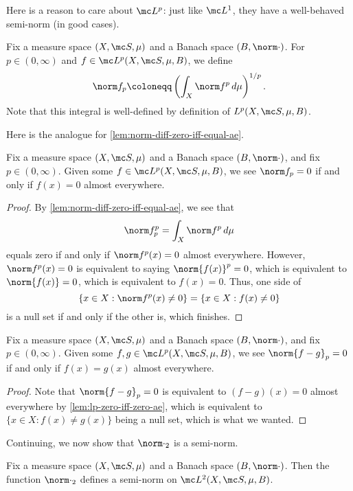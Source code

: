 \documentclass[../notes.tex]{subfiles}
\begin{document}
Here is a reason to care about $\mc L^p$: just like $\mc L^1$, they have a well-behaved semi-norm (in good cases).
\begin{notation}
	Fix a measure space $(X,\mc S,\mu)$ and a Banach space $(B,\norm\cdot)$. For $p\in(0,\infty)$ and $f\in\mc L^p(X,\mc S,\mu,B)$, we define
	\[\norm f_p\coloneqq\left(\int_X\norm f^p\,d\mu\right)^{1/p}.\]
	Note that this integral is well-defined by definition of $L^p(X,\mc S,\mu,B)$.
\end{notation}
Here is the analogue for \autoref{lem:norm-diff-zero-iff-equal-ae}.
\begin{lemma} \label{lem:lp-zero-iff-zero-ae}
	Fix a measure space $(X,\mc S,\mu)$ and a Banach space $(B,\norm\cdot)$, and fix $p\in(0,\infty)$. Given some $f\in\mc L^p(X,\mc S,\mu,B)$, we see $\norm f_p=0$ if and only if $f(x)=0$ almost everywhere.
\end{lemma}
\begin{proof}
	By \autoref{lem:norm-diff-zero-iff-equal-ae}, we see that
	\[\norm f^p_p=\int_X\norm f^p\,d\mu\]
	equals zero if and only if $\norm f^p(x)=0$ almost everywhere. However, $\norm f^p(x)=0$ is equivalent to saying $\norm{f(x)}^p=0$, which is equivalent to $\norm{f(x)}=0$, which is equivalent to $f(x)=0$. Thus, one side of
	\[\left\{x\in X:\norm f^p(x)\ne0\right\}=\{x\in X:f(x)\ne0\}\]
	is a null set if and only if the other is, which finishes.
\end{proof}
\begin{corollary} \label{cor:lp-diff-zero-iff-equal-ae}
	Fix a measure space $(X,\mc S,\mu)$ and a Banach space $(B,\norm\cdot)$, and fix $p\in(0,\infty)$. Given some $f,g\in\mc L^p(X,\mc S,\mu,B)$, we see $\norm{f-g}_p=0$ if and only if $f(x)=g(x)$ almost everywhere.
\end{corollary}
\begin{proof}
	Note that $\norm{f-g}_p=0$ is equivalent to $(f-g)(x)=0$ almost everywhere by \autoref{lem:lp-zero-iff-zero-ae}, which is equivalent to $\{x\in X:f(x)\ne g(x)\}$ being a null set, which is what we wanted.
\end{proof}
Continuing, we now show that $\norm\cdot_2$ is a semi-norm.
\begin{proposition} \label{prop:l2-semi-norm}
	Fix a measure space $(X,\mc S,\mu)$ and a Banach space $(B,\norm\cdot)$. Then the function $\norm\cdot_2$ defines a semi-norm on $\mc L^2(X,\mc S,\mu,B)$.
\end{proposition}
\end{document}
